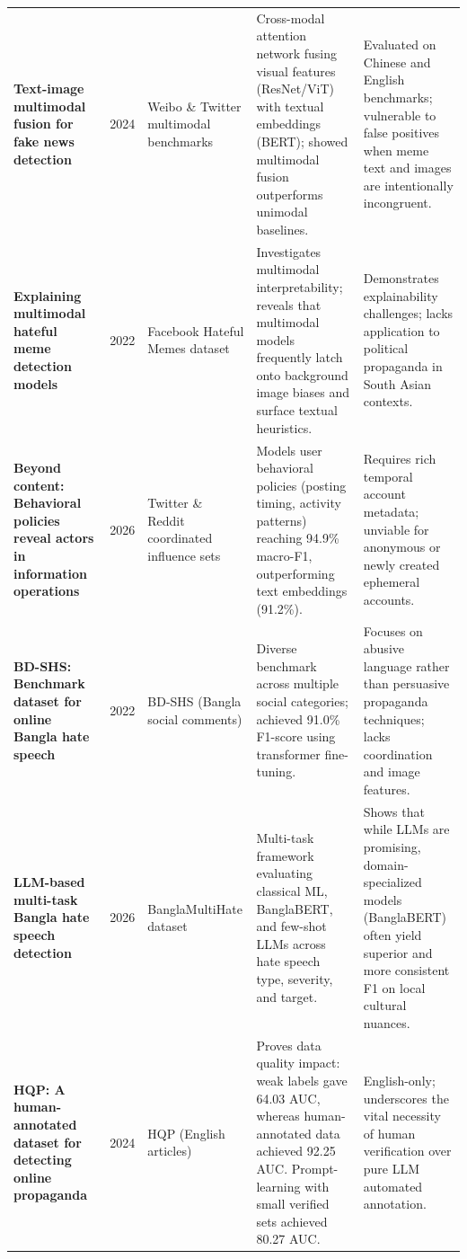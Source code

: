 \begin{longtable}{@{}L{3.1cm}C{0.8cm}L{2.2cm}L{3.5cm}L{3.3cm}@{}}
\addlinespace
\textbf{Text-image multimodal fusion for fake news detection}~\cite{lin2024} & 2024 & Weibo \& Twitter multimodal benchmarks &
Cross-modal attention network fusing visual features (ResNet/ViT) with textual embeddings (BERT); showed multimodal fusion outperforms unimodal baselines. &
Evaluated on Chinese and English benchmarks; vulnerable to false positives when meme text and images are intentionally incongruent.\\
\addlinespace
\textbf{Explaining multimodal hateful meme detection models}~\cite{hee2022} & 2022 & Facebook Hateful Memes dataset &
Investigates multimodal interpretability; reveals that multimodal models frequently latch onto background image biases and surface textual heuristics. &
Demonstrates explainability challenges; lacks application to political propaganda in South Asian contexts.\\
\addlinespace
\textbf{Beyond content: Behavioral policies reveal actors in information operations}~\cite{schneider2026} & 2026 & Twitter \& Reddit coordinated influence sets &
Models user behavioral policies (posting timing, activity patterns) reaching 94.9\% macro-F1, outperforming text embeddings (91.2\%). &
Requires rich temporal account metadata; unviable for anonymous or newly created ephemeral accounts.\\
\addlinespace
\textbf{BD-SHS: Benchmark dataset for online Bangla hate speech}~\cite{romim2022} & 2022 & BD-SHS (Bangla social comments) &
Diverse benchmark across multiple social categories; achieved 91.0\% F1-score using transformer fine-tuning. &
Focuses on abusive language rather than persuasive propaganda techniques; lacks coordination and image features.\\
\addlinespace
\textbf{LLM-based multi-task Bangla hate speech detection}~\cite{hasan2026} & 2026 & BanglaMultiHate dataset &
Multi-task framework evaluating classical ML, BanglaBERT, and few-shot LLMs across hate speech type, severity, and target. &
Shows that while LLMs are promising, domain-specialized models (BanglaBERT) often yield superior and more consistent F1 on local cultural nuances.\\
\addlinespace
\textbf{HQP: A human-annotated dataset for detecting online propaganda}~\cite{maarouf2024} & 2024 & HQP (English articles) &
Proves data quality impact: weak labels gave 64.03 AUC, whereas human-annotated data achieved 92.25 AUC. Prompt-learning with small verified sets achieved 80.27 AUC. &
English-only; underscores the vital necessity of human verification over pure LLM automated annotation.\\
\end{longtable}
\endgroup

